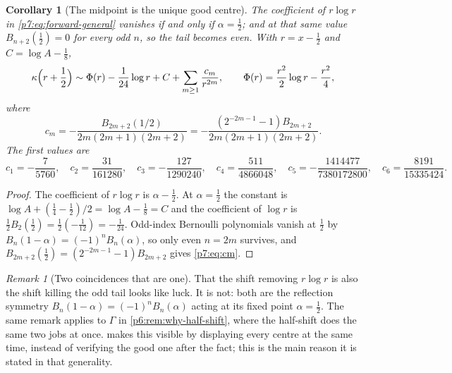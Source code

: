 \documentclass[11pt,a4paper,oneside]{book}
\theoremstyle{plain}
\newtheorem{corollary}[theorem]{Corollary}
\theoremstyle{definition}
\theoremstyle{remark}
\newtheorem{remark}[theorem]{Remark}
\begin{document}
\begin{corollary}[The midpoint is the unique good centre]
\label{p7:cor:midpoint}
The coefficient of $r\log r$ in \eqref{p7:eq:forward-general} vanishes if and
only if $\alpha=\tfrac12$; and at that same value $B_{n+2}(\tfrac12)=0$ for
every odd $n$, so the tail becomes even.  With $r=x-\tfrac12$ and
$C=\log A-\tfrac18$,
\begin{equation}\label{p7:eq:centred}
 \kappa\Bigl(r+\frac12\Bigr)
 \sim\Phi(r)-\frac1{24}\log r+C+\sum_{m\ge1}\frac{c_m}{r^{2m}},
 \qquad
 \Phi(r)=\frac{r^{2}}2\log r-\frac{r^{2}}4,
\end{equation}
where
\begin{equation}\label{p7:eq:cm}
 c_m=-\frac{B_{2m+2}(1/2)}{2m(2m+1)(2m+2)}
    =-\frac{(2^{-2m-1}-1)B_{2m+2}}{2m(2m+1)(2m+2)} .
\end{equation}
The first values are
\begin{equation}\label{p7:eq:cm-values}
 c_1=-\frac7{5760},\quad
 c_2=\frac{31}{161280},\quad
 c_3=-\frac{127}{1290240},\quad
 c_4=\frac{511}{4866048},\quad
 c_5=-\frac{1414477}{7380172800},\quad
 c_6=\frac{8191}{15335424}.
\end{equation}
\end{corollary}

\begin{proof}
The coefficient of $r\log r$ is $\alpha-\tfrac12$.  At $\alpha=\tfrac12$ the
constant is $\log A+(\tfrac14-\tfrac12)/2=\log A-\tfrac18=C$ and the
coefficient of $\log r$ is $\tfrac12B_2(\tfrac12)=\tfrac12(-\tfrac1{12})
=-\tfrac1{24}$.  Odd-index Bernoulli polynomials vanish at $\tfrac12$ by
$B_n(1-\alpha)=(-1)^{n}B_n(\alpha)$, so only even $n=2m$ survives, and
$B_{2m+2}(\tfrac12)=(2^{-2m-1}-1)B_{2m+2}$ gives \eqref{p7:eq:cm}.
\end{proof}

\begin{remark}[Two coincidences that are one]\label{p7:rem:centre}
That the shift removing $r\log r$ is also the shift killing the odd tail looks
like luck.  It is not: both are the reflection symmetry
$B_n(1-\alpha)=(-1)^{n}B_n(\alpha)$ acting at its fixed point
$\alpha=\tfrac12$.  The same remark applies to $\Gamma$ in
\cref{p6:rem:why-half-shift}, where the half-shift does the same two jobs at
once.   makes this visible by displaying every centre at
the same time, instead of verifying the good one after the fact; this is the
main reason it is stated in that generality.
\end{remark}
\end{document}
